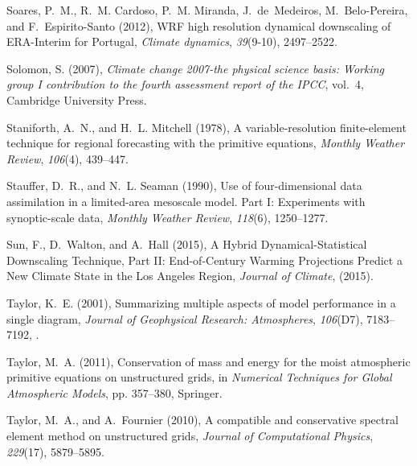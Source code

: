 \documentclass[draft,ms]{agutex}   %
\begin{document}
\begin{article}
\begin{thebibliography}{72}
Soares, P.~M., R.~M. Cardoso, P.~M. Miranda, J.~de~Medeiros, M.~Belo-Pereira,
  and F.~Espirito-Santo (2012), {WRF high resolution dynamical downscaling of
  ERA-Interim for Portugal}, \textit{Climate dynamics}, \textit{39}(9-10),
  2497--2522.

Solomon, S. (2007), \textit{Climate change 2007-the physical science basis:
  Working group I contribution to the fourth assessment report of the IPCC},
  vol.~4, Cambridge University Press.

Staniforth, A.~N., and H.~L. Mitchell (1978), A variable-resolution
  finite-element technique for regional forecasting with the primitive
  equations, \textit{Monthly Weather Review}, \textit{106}(4), 439--447.

Stauffer, D.~R., and N.~L. Seaman (1990), {Use of four-dimensional data
  assimilation in a limited-area mesoscale model. Part I: Experiments with
  synoptic-scale data}, \textit{Monthly Weather Review}, \textit{118}(6),
  1250--1277.

Sun, F., D.~Walton, and A.~Hall (2015), {A Hybrid Dynamical-Statistical
  Downscaling Technique, Part II: End-of-Century Warming Projections Predict a
  New Climate State in the Los Angeles Region}, \textit{Journal of Climate},
  (2015).

Taylor, K.~E. (2001), Summarizing multiple aspects of model performance in a
  single diagram, \textit{Journal of Geophysical Research: Atmospheres},
  \textit{106}(D7), 7183--7192, .

Taylor, M.~A. (2011), Conservation of mass and energy for the moist atmospheric
  primitive equations on unstructured grids, in \textit{Numerical Techniques
  for Global Atmospheric Models}, pp. 357--380, Springer.

Taylor, M.~A., and A.~Fournier (2010), A compatible and conservative spectral
  element method on unstructured grids, \textit{Journal of Computational
  Physics}, \textit{229}(17), 5879--5895.


\end{thebibliography}
\end{article}
\end{document}
